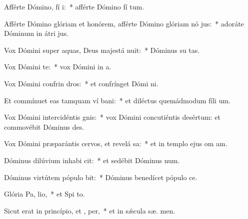 \item Afférte Dómino, fí i:~* afférte Dómino fí tum.
\item Afférte Dómino glóriam et honórem, afférte Dómino glóriam nó jus:~* adoráte Dóminum in átri  jus.
\item Vox Dómini super aquas, Deus majestá nuit:~* Dóminus su  tas.
\item Vox Dómini  te:~* vox Dómini in a.
\item Vox Dómini confrin dros:~* et confrínget Dómi  ni.
\item Et commínuet eas tamquam ví bani:~* et diléctus quemádmodum fíli um.
\item Vox Dómini intercidéntis  gnis:~* vox Dómini concutiéntis desértum: et commovébit Dóminus  des.
\item Vox Dómini præparántis cervos, et revelá sa:~* et in templo ejus om  am.
\item Dóminus dilúvium inhabi cit:~* et sedébit Dóminus   num.
\item Dóminus virtútem pópulo  bit:~* Dóminus benedícet pópulo   ce.
\item Glória Pa,  lio,~* et Spi to.
\item Sicut erat in princípio, et ,  per,~* et in sǽcula sæ. men.
